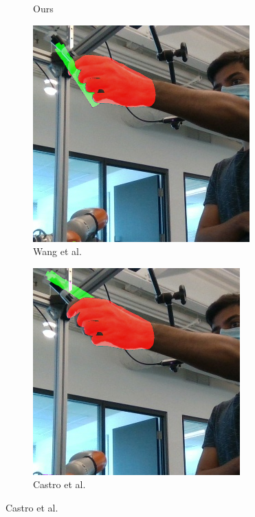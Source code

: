 \begin{figure}[h!]
\begin{subfigure}[b]{0.16\linewidth}
    \caption{Ours}
  \end{subfigure}
    \begin{subfigure}[b]{0.16\linewidth}
    \includegraphics[width=0.98\linewidth]{figs/180000_10}
    \caption{Wang et al. \cite{wang2019densefusion}}
  \end{subfigure}
    \begin{subfigure}[b]{0.16\linewidth}
    \includegraphics[width=0.98\linewidth]{figs/180000_13}
    \caption{Castro et al. \cite{castro2023crt}}
  \end{subfigure}  
  

\end{figure}
